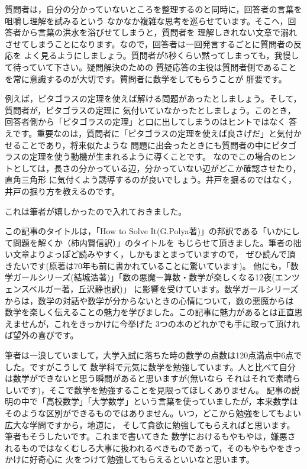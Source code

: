 \documentclass[./main]{subfiles}
\begin{document}

質問者は，自分の分かっていないところを整理するのと同時に，回答者の言葉を咀嚼し理解を試みるという
なかなか複雑な思考を巡らせています。そこへ，回答者から言葉の洪水を浴びせてしまうと，質問者を
理解しきれない文章で溺れさせてしまうことになります。なので，回答者は一回発言するごとに質問者の反応を
よく見るようにしましょう。質問者が5秒くらい黙ってしまっても，我慢して待っていて下さい。疑問解決のための
質疑応答の主役は質問者側であることを常に意識するのが大切です。質問者に数学をしてもらうことが
肝要です。


例えば，ピタゴラスの定理を使えば解ける問題があったとしましょう。そして，質問者が，ピタゴラスの定理に
気付いていなかったとしましょう。このとき，回答者側から「ピタゴラスの定理」と口に出してしまうのはヒントではなく
答えです。重要なのは，質問者に「ピタゴラスの定理を使えば良さげだ」と気付かせることであり，将来似たような
問題に出会ったときにも質問者の中にピタゴラスの定理を使う動機が生まれるように導くことです。
なのでこの場合のヒントとしては，長さの分かっている辺，分かっていない辺がどこか確認させたり，直角三角形
に気付くよう誘導するのが良いでしょう。井戸を掘るのではなく，井戸の掘り方を教えるのです。


これは筆者が嬉しかったので入れておきました。

この記事のタイトルは，「How to Solve It(G.Polya著)」の邦訳である「いかにして問題を解くか（柿内賢信訳）」のタイトルを
もじらせて頂きました。筆者の拙い文章よりよっぽど読みやすく，しかもまとまっていますので，
ぜひ読んで頂きたいです(原著は70年も前に書かれていることに驚いています)。
他にも，「数学ガールシリーズ(結城浩著)」「数の悪魔ー算数・数学が楽しくなる12夜(エンツェンスベルガー著，丘沢静也訳)」
に影響を受けています。数学ガールシリーズからは，数学の対話や数学が分からないときの心情について，数の悪魔からは
数学を楽しく伝えることの魅力を学びました。この記事に魅力があるとは正直思えませんが，これをきっかけに今挙げた
3つの本のどれかでも手に取って頂ければ望外の喜びです。

筆者は一浪していまして，大学入試に落ちた時の数学の点数は120点満点中6点でした。ですがこうして
数学科で元気に数学を勉強しています。人と比べて自分は数学ができないと思う瞬間があると思いますが(無いなら
それはそれで素晴らしいです)，そこで数学を勉強することを見限ってほしくありません。
記事の説明の中で「高校数学」「大学数学」という言葉を使っていましたが，本来数学は
そのような区別ができるものではありません。いつ，どこから勉強をしてもよい広大な学問ですから，地道に，
そして貪欲に勉強してもらえればと思います。筆者もそうしたいです。これまで書いてきた
数学におけるもやもやは，嫌悪されるものではなくむしろ大事に扱われるべきものであって，そのもやもやをきっかけに好奇心に
火をつけて勉強してもらえるといいなと思います。
\end{document}
